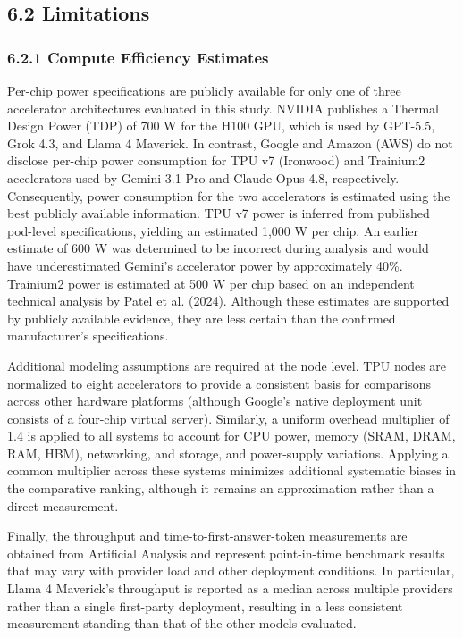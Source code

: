 \documentclass[11pt]{article}
\begin{document}
\subsection*{6.2 Limitations}

\subsubsection*{6.2.1 Compute Efficiency Estimates}

Per-chip power specifications are publicly available for only one of three accelerator architectures evaluated in this study. NVIDIA publishes a Thermal Design Power (TDP) of 700 W for the H100 GPU, which is used by GPT-5.5, Grok 4.3, and Llama 4 Maverick. In contrast, Google and Amazon (AWS) do not disclose per-chip power consumption for TPU v7 (Ironwood) and Trainium2 accelerators used by Gemini 3.1 Pro and Claude Opus 4.8, respectively. Consequently, power consumption for the two accelerators is estimated using the best publicly available information. TPU v7 power is inferred from published pod-level specifications, yielding an estimated 1,000 W per chip. An earlier estimate of 600 W was determined to be incorrect during analysis and would have underestimated Gemini's accelerator power by approximately 40\%. Trainium2 power is estimated at 500 W per chip based on an independent technical analysis by Patel et al. (2024). Although these estimates are supported by publicly available evidence, they are less certain than the confirmed manufacturer's specifications.

Additional modeling assumptions are required at the node level. TPU nodes are normalized to eight accelerators to provide a consistent basis for comparisons across other hardware platforms (although Google's native deployment unit consists of a four-chip virtual server). Similarly, a uniform overhead multiplier of 1.4 is applied to all systems to account for CPU power, memory (SRAM, DRAM, RAM, HBM), networking, and storage, and power-supply variations. Applying a common multiplier across these systems minimizes additional systematic biases in the comparative ranking, although it remains an approximation rather than a direct measurement.

Finally, the throughput and time-to-first-answer-token measurements are obtained from Artificial Analysis and represent point-in-time benchmark results that may vary with provider load and other deployment conditions. In particular, Llama 4 Maverick's throughput is reported as a median across multiple providers rather than a single first-party deployment, resulting in a less consistent measurement standing than that of the other models evaluated.
\end{document}
